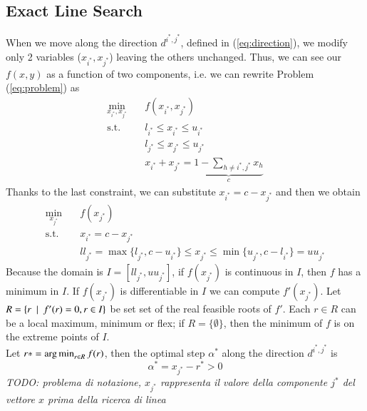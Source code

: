 \iffalse
\begin{algorithm}
 \KwData{Given $\alpha > 0$, $\delta \in (0,1)$, $\gamma \in (0, 1/2)$ and the initial stepsize $\alpha^{(k)} = \min \{\beta^{(k)},\alpha \}$}
 Set $\lambda = \alpha^{(k)}$\\
 \While{$f(x^{(k)} + \lambda d^{(k)}) > f(x^{(k)}) + \gamma \lambda \nabla_x f(x^{(k)})^T d^{(k)}$}{
  Set $\lambda = \delta \lambda$
 }
 \caption{Armijo-Type Line Search}
\end{algorithm}
\fi
\subsection{Exact Line Search}
When we move along the direction $d^{i^*,j^*}$, defined in (\ref{eq:direction}), we modify only 2 variables ($x_{i^*}, x_{j^*}$) leaving the others unchanged. Thus, we can see our $f(x,y)$ as a function of two components, i.e. we can rewrite Problem (\ref{eq:problem}) as
\begin{subequations}\label{eq:twocomp} 
\begin{align}
\min_{x_{i^*}, x_{j^*}} & \quad f(x_{i^*}, x_{j^*})  \\
\text{s.t.} & \quad l_{i^*} \leq x_{i^*}  \leq u_{i^*} \\
& \quad l_{j^*} \leq x_{j^*}  \leq u_{j^*} \\
& \quad x_{i^*}+x_{j^*} = \underbrace{1-\sum_{h\ne {i^*},{j^*}}x_h}_c
\end{align}
\end{subequations}
Thanks to the last constraint, we can substitute $x_{i^*} = c - x_{j^*}$ and then we obtain
\begin{subequations}\label{eq:onecomp} 
\begin{align}
\min_{ x_{j^*}} & \quad f(x_{j^*}) \\
\text{s.t.} & \quad x_{i^*} = c - x_{j^*} \\
& \quad ll_{j^*} = \max\{l_{j^*}, c - u_{i^*}\} \leq x_{j^*} \leq \min \{ u_{j^*}, c-l_{i^*}\} = uu_{j^*}
\end{align}
\end{subequations}
Because the domain is $I=[ll_{j^*}, uu_{j^*}]$, if $f(x_{j^*})$ is continuous in $I$, then $f$ has a minimum in $I$. If $f(x_{j^*})$ is differentiable in $I$ we can compute $f'(x_{j^*})$. Let $R = \{ r \enskip | \enskip f'(r) = 0, r \in I \}$ be set set of the real feasible roots of $f'$. Each $r \in R$ can be a local maximum, minimum or flex; if $R = \{ \emptyset \}$, then the minimum of $f$ is on the extreme points of $I$.\\ 
Let $r* = \operatorname*{arg\,min}_{r \in R} f(r)$, then the optimal step $\alpha^*$ along the direction $d^{i^*,j^*}$ is
\begin{equation}
\alpha^* = x_{j^*} - r^* > 0
\end{equation} 
\textit{TODO: problema di notazione, $x_{j^*}$ rappresenta il valore della componente $j^*$ del vettore $x$ prima della ricerca di linea}